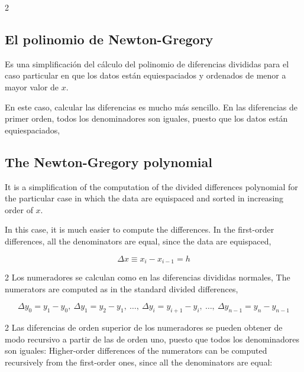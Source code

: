 \begin{paracol}{2}
\subsection{El polinomio de Newton-Gregory} \label{sec:newgre}  
Es una simplificación del cálculo del polinomio de diferencias divididas para el caso particular en que los datos están equiespaciados y ordenados de menor a mayor valor de $x$.

En este caso, calcular las diferencias es mucho más sencillo. En las diferencias de primer orden, todos los denominadores son iguales, puesto que los datos están equiespaciados,
\switchcolumn
\subsection{The Newton-Gregory polynomial}
It is a simplification of the computation of the divided differences polynomial for the particular case in which the data are equispaced and sorted in increasing order of $x$.

In this case, it is much easier to compute the differences. In the first-order differences, all the denominators are equal, since the data are equispaced,
\end{paracol}
\begin{equation*}
\Delta x \equiv x_i-x_{i-1} =h
\end{equation*}
\begin{paracol}{2}
Los numeradores se calculan como en las diferencias divididas normales,
\switchcolumn
The numerators are computed as in the standard divided differences,
\end{paracol}
\begin{equation*}
\Delta y_0= y_1-y_0, \ \Delta y_1=y_2-y_1, \ \dots, \ \Delta y_i=y_{i+1}-y_i, \ \dots, \ \Delta y_{n-1}=y_{n}-y_{n-1}
\end{equation*}
\begin{paracol}{2}
Las diferencias de orden superior de los numeradores se pueden obtener de modo recursivo a partir de las de orden uno, puesto que todos los denominadores son iguales:
\switchcolumn
Higher-order differences of the numerators can be computed recursively from the first-order ones, since all the denominators are equal:
\end{paracol}

